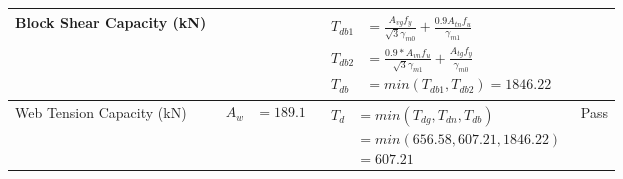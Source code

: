 \documentclass{article}%
\begin{document}
\begin{longtable}{|p{4cm}|p{4cm}|p{7cm}|p{1.5cm}|}
\hline%
Block Shear Capacity (kN)&&$\begin{aligned}T_{db1} &= \frac{A_{vg} f_{y}}{\sqrt{3} \gamma_{m0}} + \frac{0.9 A_{tn} f_{u}}{\gamma_{m1}}\\ T_{db2} &= \frac{0.9*A_{vn} f_{u}}{\sqrt{3} \gamma_{m1}} + \frac{A_{tg} f_{y}}{\gamma_{m0}}\\ T_{db} &= min(T_{db1}, T_{db2})= 1846.22\end{aligned}$&\\%
\hline%
Web Tension Capacity (kN)&$\begin{aligned} A_w &=189.1\end{aligned}$&$\begin{aligned} T_d &= min(T_{dg},T_{dn},T_{db})\\ &= min(656.58,607.21,1846.22)\\ &=607.21\end{aligned}$&Pass\\%
\hline%
\end{longtable}

%
\newpage%
\end{document}
